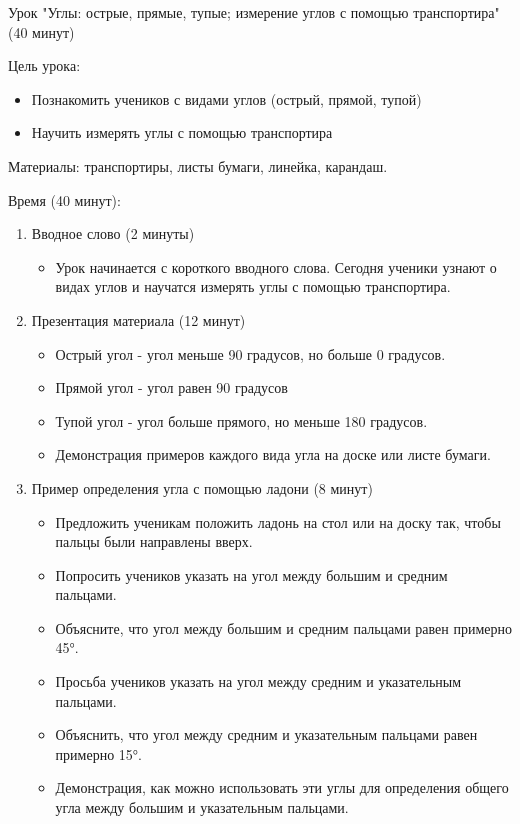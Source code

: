 \documentclass[a4paper,12pt]{article}
\begin{document}
Урок "Углы: острые, прямые, тупые; измерение углов с помощью транспортира" (40 минут)

Цель урока:
\begin{itemize}
\item Познакомить учеников с видами углов (острый, прямой, тупой)
\item Научить измерять углы с помощью транспортира
\end{itemize}

Материалы: транспортиры, листы бумаги, линейка, карандаш.

Время (40 минут):
\begin{enumerate}
\item Вводное слово (2 минуты)
	\begin{itemize}
	\item Урок начинается с короткого вводного слова. Сегодня ученики узнают о видах углов и научатся измерять углы с помощью транспортира.
	\end{itemize}

\item Презентация материала (12 минут)
	\begin{itemize}
	\item Острый угол - угол меньше 90 градусов, но больше 0 градусов.
	\item Прямой угол - угол равен 90 градусов
	\item Тупой угол - угол больше прямого, но меньше 180 градусов.
	\item Демонстрация примеров каждого вида угла на доске или листе бумаги.
	\end{itemize}

\item Пример определения угла с помощью ладони (8 минут)
	\begin{itemize}
	\item Предложить ученикам положить ладонь на стол или на доску так, чтобы пальцы были направлены вверх.
	\item Попросить учеников указать на угол между большим и средним пальцами.
	\item Объясните, что угол между большим и средним пальцами равен примерно 45°.
	\item Просьба учеников указать на угол между средним и указательным пальцами.
	\item Объяснить, что угол между средним и указательным пальцами равен примерно 15°.
	\item Демонстрация, как можно использовать эти углы для определения общего угла между большим и указательным пальцами.
	\end{itemize}


\end{enumerate}
\end{document}
